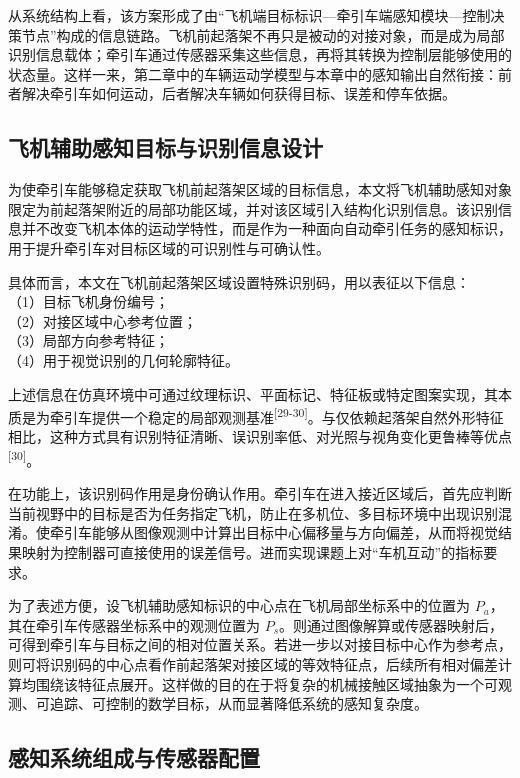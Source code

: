 \documentclass[UTF8,a4paper,12pt]{ctexart}
\begin{document}
从系统结构上看，该方案形成了由``飞机端目标标识---牵引车端感知模块---控制决策节点''构成的信息链路。飞机前起落架不再只是被动的对接对象，而是成为局部识别信息载体；牵引车通过传感器采集这些信息，再将其转换为控制层能够使用的状态量。这样一来，第二章中的车辆运动学模型与本章中的感知输出自然衔接：前者解决牵引车如何运动，后者解决车辆如何获得目标、误差和停车依据。

\subsection{飞机辅助感知目标与识别信息设计}\label{_Toc228997185}

为使牵引车能够稳定获取飞机前起落架区域的目标信息，本文将飞机辅助感知对象限定为前起落架附近的局部功能区域，并对该区域引入结构化识别信息。该识别信息并不改变飞机本体的运动学特性，而是作为一种面向自动牵引任务的感知标识，用于提升牵引车对目标区域的可识别性与可确认性。

具体而言，本文在飞机前起落架区域设置特殊识别码，用以表征以下信息：\\
（1）目标飞机身份编号；\\
（2）对接区域中心参考位置；\\
（3）局部方向参考特征；\\
（4）用于视觉识别的几何轮廓特征。

上述信息在仿真环境中可通过纹理标识、平面标记、特征板或特定图案实现，其本质是为牵引车提供一个稳定的局部观测基准\textsuperscript{[29-30]}。与仅依赖起落架自然外形特征相比，这种方式具有识别特征清晰、误识别率低、对光照与视角变化更鲁棒等优点\textsuperscript{[30]}。

在功能上，该识别码作用是身份确认作用。牵引车在进入接近区域后，首先应判断当前视野中的目标是否为任务指定飞机，防止在多机位、多目标环境中出现识别混淆。使牵引车能够从图像观测中计算出目标中心偏移量与方向偏差，从而将视觉结果映射为控制器可直接使用的误差信号。进而实现课题上对``车机互动''的指标要求。

为了表述方便，设飞机辅助感知标识的中心点在飞机局部坐标系中的位置为 \(P_{a}\)，其在牵引车传感器坐标系中的观测位置为 \(P_{s}\)。则通过图像解算或传感器映射后，可得到牵引车与目标之间的相对位置关系。若进一步以对接目标中心作为参考点，则可将识别码的中心点看作前起落架对接区域的等效特征点，后续所有相对偏差计算均围绕该特征点展开。这样做的目的在于将复杂的机械接触区域抽象为一个可观测、可追踪、可控制的数学目标，从而显著降低系统的感知复杂度。

\subsection{感知系统组成与传感器配置}\label{_Toc228997186}
\end{document}
